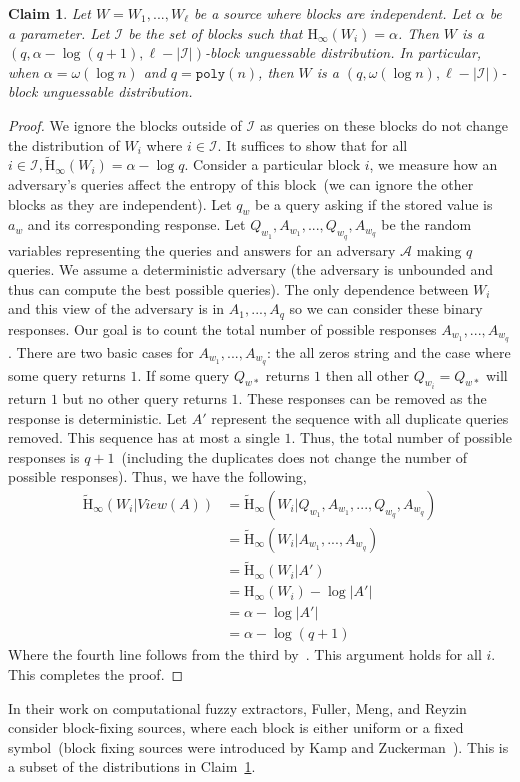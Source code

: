 \documentclass[11pt]{article}
\newcommand{\clref}[1]{\mbox{Claim~\ref{#1}}}
\newcommand{\poly}{\ensuremath{\mathtt{poly}}\xspace}
\newcommand{\Hoo}{\mathrm{H}_\infty}
\newcommand{\Hav}{\tilde{\mathrm{H}}_\infty}
\newtheorem{claim}[theorem]{Claim}
\begin{document}
\begin{claim}
\label{cl:independent high ent}
Let $W = W_1,..., W_\ell$ be a source where blocks are independent.  Let $\alpha$ be a parameter.  Let $\mathcal{I}$ be the set of blocks such that $\Hoo(W_i ) =\alpha $.  Then $W$ is a $(q, \alpha - \log (q+1), \ell - |\mathcal{I}|)$-block unguessable distribution.  In particular, when $\alpha = \omega(\log n)$ and $q = \poly(n)$, then $W$ is a $(q, \omega(\log n), \ell - |\mathcal{I}|)$-block unguessable distribution.
\end{claim}
\begin{proof}
We ignore the blocks outside of $\mathcal{I}$ as queries on these blocks do not change the distribution of $W_i$ where $i\in \mathcal{I}$.  It suffices to show that for all $i\in \mathcal{I}, \Hav(W_i) = \alpha -\log q$.  
Consider a particular block $i$, we measure how an adversary's queries affect the entropy of this block~(we can ignore the other blocks as they are independent).  
Let $q_w$ be a query asking if the stored value is $a_w$ and its corresponding response.  
Let $Q_{w_1},A_{w_1},..., Q_{w_q}, A_{w_q}$ be the random variables representing the queries and answers for an  adversary $\mathcal{A}$ making $q$ queries.  We assume a deterministic adversary (the adversary is unbounded and thus can compute the best possible queries).  The only dependence between $W_i$ and this view of the adversary is in $A_1,..., A_q$ so we can consider these binary responses.  Our goal is to count the total number of possible responses $A_{w_1},..., A_{w_q}$.  There are two basic cases for $A_{w_1},..., A_{w_q}$: the all zeros string and the case where some query returns $1$.  If some query $Q_{w*}$ returns $1$ then all other $Q_{w_i} = Q_{w*}$ will return $1$ but no other query returns $1$.  These responses can be removed as the response is deterministic.  Let $A'$ represent the sequence with all duplicate queries removed.  This sequence has at most a single $1$.  Thus, the total number of possible responses is $q+1$~(including the duplicates does not change the number of possible responses).  Thus, we have the following,
\begin{align*}
\Hav(W_i | View(A)) &= \Hav(W_i| Q_{w_1}, A_{w_1},..., Q_{w_q}, A_{w_q})\\
&=\Hav(W_i | A_{w_1},..., A_{w_q})\\
&=\Hav(W_i |A') \\
&=\Hoo(W_i) - \log |A'|\\
&=\alpha - \log |A'|\\
&=\alpha - \log (q+1)
\end{align*}
Where the fourth line follows from the third by~\cite[Lemma 2.2]{DBLP:journals/siamcomp/DodisORS08}.
This argument holds for all $i$.  This completes the proof.
\end{proof}
In their work on computational fuzzy extractors, Fuller, Meng, and Reyzin~\cite{fuller2013computational} consider block-fixing sources, where each block is either uniform or a fixed symbol~(block fixing sources were introduced by Kamp and Zuckerman~\cite{KZ07}).  This is a subset of the distributions in \clref{cl:independent high ent}.  
\end{document}
